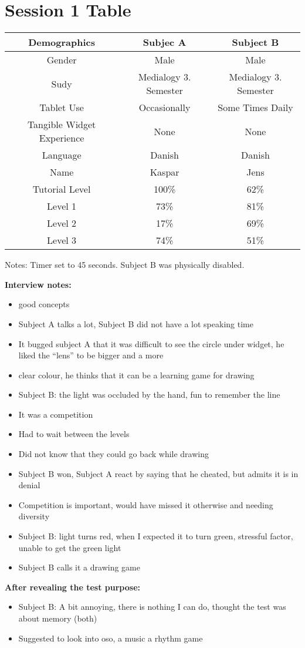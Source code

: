 \section*{Session 1 Table}
\begin{tabular}{|c|c|c|}
\hline 
\textbf{Demographics} & Subjec A & Subject B \\ 
\hline 
Gender & Male  & Male \\ 
\hline 
Sudy & Medialogy 3. Semester & Medialogy 3. Semester \\ 
\hline 
Tablet Use & Occasionally & Some Times Daily \\ 
\hline 
Tangible Widget Experience & None & None \\ 
\hline 
Language & Danish & Danish\\ 
\hline 
Name & Kaspar & Jens\\ 
\hline \hline
Tutorial Level & 100\% & 62\% \\ 
\hline 
Level 1 & 73\% & 81\% \\ 
\hline 
Level 2 & 17\% & 69\% \\ 
\hline 
Level 3 & 74\% & 51\% \\ 
\hline 
\end{tabular} 

Notes: Timer set to 45 seconds. Subject B was physically disabled. 

\textbf{Interview notes:}
\begin{itemize}
\item good concepts
\item Subject A talks a lot, Subject B did not have a lot speaking time
\item It bugged subject A that it was difficult to see the circle under widget, he liked the “lens” to be bigger and a more \item clear colour, he thinks that it can be a learning game for drawing
\item Subject B: the light was occluded by the hand, fun to remember the line
\item It was a competition
\item Had to wait between the levels
\item Did not know that they could go back while drawing
\item Subject B won, Subject A react by saying that he cheated, but admits it is in denial
\item Competition is important, would have missed it otherwise and needing diversity
\item Subject B: light turns red, when I expected it to turn green, stressful factor, unable to get the green light
\item Subject B calls it a drawing game
\end{itemize}

\textbf{After revealing the test purpose:}
\begin{itemize}
\item Subject B: A bit annoying, there is nothing I can do, thought the test was about memory (both)
\item Suggested to look into oso, a music a rhythm game
\end{itemize}


